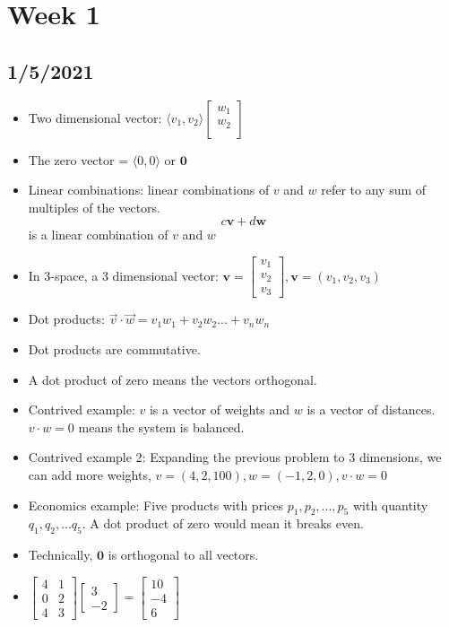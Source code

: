 \section{Week 1}
\subsection{1/5/2021}
\begin{itemize}
    \item Two dimensional vector: $\langle v_1, v_2 \rangle \begin{bmatrix}
        w_1 \\
        w_2 \\
    \end{bmatrix}$
    \item The zero vector = $\langle 0, 0 \rangle$ or $\textbf{0}$
    \item Linear combinations: linear combinations of $v$ and $w$ refer to any sum of multiples of the vectors. $$c\textbf{v} + d\textbf{w}$$ is a linear combination of $v$ and $w$
    \item In 3-space, a 3 dimensional vector: $\textbf{v} = \begin{bmatrix} v_1 \\ v_2 \\ v_3 \end{bmatrix}, \textbf{v} = (v_1, v_2, v_3)$
    \item Dot products: $\Vec{v} \cdot \Vec{w} = v_1w_1+v_2w_2...+v_nw_n$
    \item Dot products are commutative.
    \item A dot product of zero means the vectors orthogonal.
    \item Contrived example: $v$ is a vector of weights and $w$ is a vector of distances. $v \cdot w = 0$ means the  system is balanced.
    \item Contrived example 2: Expanding the previous problem to 3 dimensions, we can add more weights, $v= (4,2,100), w=(-1,2,0), v\cdot w = 0$
    \item Economics example: Five products with prices $p_1, p_2, ..., p_5$ with quantity $q_1, q_2, ... q_5$. A dot product of zero would mean it breaks even.
    \item Technically, $\textbf{0}$ is orthogonal to all vectors.
    \item $\begin{bmatrix} 4 & 1 \\ 0 & 2 \\ 4 & 3\end{bmatrix} \begin{bmatrix} 3 \\ -2 \end{bmatrix} = \begin{bmatrix} 10 \\ -4 \\ 6\end{bmatrix}$

\end{itemize}
